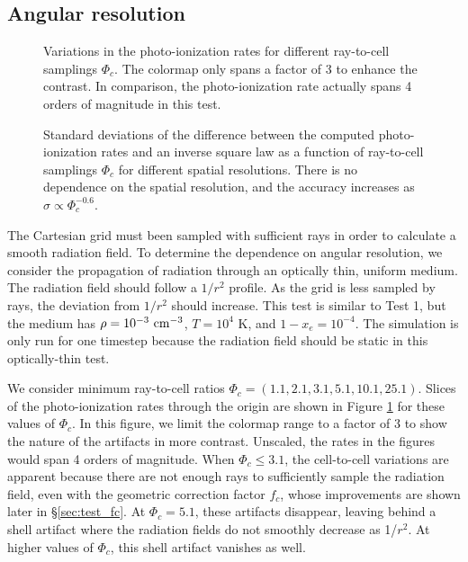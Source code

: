 \documentclass[useAMS,usenatbib,a4paper]{mn2e}
\begin{document}
\subsection{Angular resolution}
\label{sec:ang_dep}

\begin{figure}
  \caption{\label{fig:ang_dep1} Variations in the photo-ionization
    rates for different ray-to-cell samplings $\Phi_c$.  The colormap
    only spans a factor of 3 to enhance the contrast.  In comparison,
    the photo-ionization rate actually spans 4 orders of magnitude in
    this test.}
\end{figure}

\begin{figure}
  \caption{\label{fig:ang_dep2} Standard deviations of the difference
    between the computed photo-ionization rates and an inverse square
    law as a function of ray-to-cell samplings $\Phi_c$ for different
    spatial resolutions.  There is no dependence on the spatial
    resolution, and the accuracy increases as $\sigma \propto
    \Phi_c^{-0.6}$.}
\end{figure}

The Cartesian grid must been sampled with sufficient rays in order to
calculate a smooth radiation field.  To determine the dependence on
angular resolution, we consider the propagation of radiation through
an optically thin, uniform medium.  The radiation field should follow
a $1/r^2$ profile.  As the grid is less sampled by rays, the deviation
from $1/r^2$ should increase.  This test is similar to Test 1, but the
medium has $\rho = 10^{-3}~\cubecm$, $T = 10^4$ K, and $1 - x_e =
10^{-4}$.  The simulation is only run for one timestep because the
radiation field should be static in this optically-thin test.

We consider minimum ray-to-cell ratios $\Phi_c = (1.1, 2.1, 3.1, 5.1,
10.1, 25.1)$.  Slices of the photo-ionization rates through the origin
are shown in Figure \ref{fig:ang_dep1} for these values of $\Phi_c$.
In this figure, we limit the colormap range to a factor of 3 to show
the nature of the artifacts in more contrast.  Unscaled, the rates in
the figures would span 4 orders of magnitude.  When $\Phi_c \le 3.1$,
the cell-to-cell variations are apparent because there are not enough
rays to sufficiently sample the radiation field, even with the
geometric correction factor $f_c$, whose improvements are shown later
in \S\ref{sec:test_fc}.  At $\Phi_c = 5.1$, these artifacts disappear,
leaving behind a shell artifact where the radiation fields do not
smoothly decrease as 1/$r^2$.  At higher values of $\Phi_c$, this
shell artifact vanishes as well.  
\end{document}
